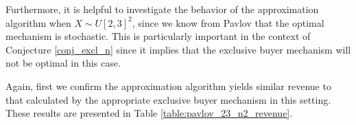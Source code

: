 




  

Furthermore, it is helpful to investigate the behavior of the approximation algorithm when $X \sim U[2,3]^2$, since we know from Pavlov \autocite*{pavlov2011optimal} that the optimal mechanism is stochastic. This is particularly important in the context of Conjecture \ref{conj_excl_n} since it implies that the exclusive buyer mechanism will not be optimal in this case.

Again, first we confirm the approximation algorithm yields similar revenue to that calculated by the appropriate exclusive buyer mechanism in this setting. These results are presented in Table \ref{table:pavlov_23_n2_revenue}.

